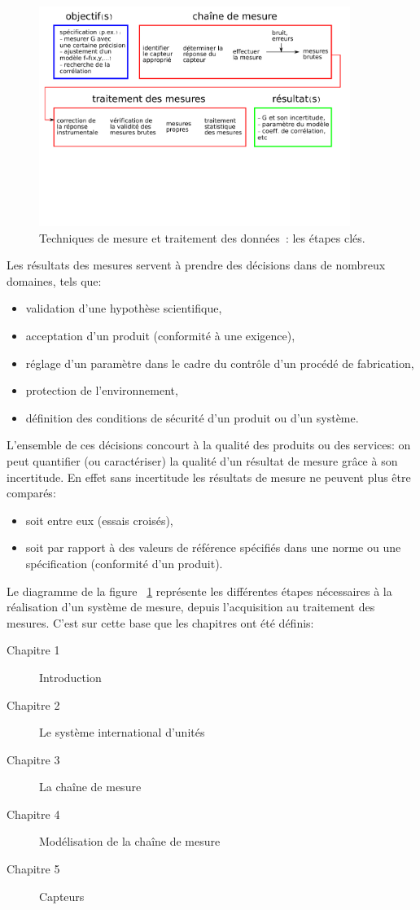 \begin{figure}[ht]
   \centering
   \includegraphics[width=0.9\textwidth]{assets/figures/flowChartTechMes.pdf}
   \caption{Techniques de mesure et traitement des données~: les étapes clés.}
   \label{fig:flowchartTechMes}
\end{figure}
Les résultats des mesures servent à prendre des décisions dans de nombreux domaines, tels que:
\begin{itemize}\itemsep1pt
\renewcommand{\labelitemi}{$\bullet$}
\item validation d'une hypothèse scientifique,
\item acceptation d'un produit (conformité à une exigence),
\item réglage d'un paramètre dans le cadre du contrôle d'un procédé de fabrication,
\item protection de l'environnement,
\item définition des conditions de sécurité d'un produit ou d'un système.
\end{itemize}
L'ensemble de ces décisions concourt à la qualité des produits ou des services: on peut quantifier (ou caractériser) la qualité d'un résultat de mesure grâce à son incertitude.
En effet sans incertitude les résultats de mesure ne peuvent plus être comparés:
\begin{itemize}\itemsep1pt
\renewcommand{\labelitemi}{$\bullet$}
\item soit entre eux (essais croisés),
\item soit par rapport à des valeurs de référence spécifiés dans une norme ou une spécification (conformité d'un produit).
\end{itemize}

Le diagramme de la figure  ~\ref{fig:flowchartTechMes} représente les différentes étapes nécessaires à la réalisation d'un système de mesure, depuis l'acquisition au traitement des mesures. C'est sur cette base que les chapitres ont été définis:
\begin{description}
\item[Chapitre 1] Introduction
\item[Chapitre 2] Le système international d'unités
\item[Chapitre 3] La chaîne de mesure
\item[Chapitre 4] Modélisation de la chaîne de mesure
\item[Chapitre 5] Capteurs
\end{description}

